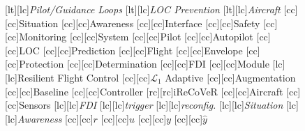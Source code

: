 \documentclass[letter,onecolumn,12pt]{aiaa-tc}
\newcommand{\Lone}{\mathcal{L}_1}
\begin{document}
\begin{figure}[t]
\centering
\small
{}[lt][lc]{{\sf \it Pilot/Guidance Loops}}
[lt][lc]{{\sf \it LOC Prevention}}
[lt][lc]{{\sf \it Aircraft}}
%
[cc][cc]{{\sf Situation}}
[cc][cc]{{\sf Awareness}}
[cc][cc]{{\sf Interface}}
%
[cc][cc]{{\sf Safety}}
[cc][cc]{{\sf Monitoring}}
[cc][cc]{{\sf System}}
%
[cc][cc]{{\sf Pilot}}
[cc][cc]{{\sf Autopilot}}
%
[cc][cc]{{\sf LOC}}
[cc][cc]{{\sf Prediction}}
%
[cc][cc]{{\sf Flight}}
[cc][cc]{{\sf Envelope}}
[cc][cc]{{\sf Protection}}
[cc][cc]{{\sf Determination}}
%
[cc][cc]{{\sf FDI}}
[cc][cc]{{\sf Module}}
%
[lc][lc]{{\sf Resilient Flight Control}}
[cc][cc]{{\sf $\Lone$ Adaptive}}
[cc][cc]{{\sf Augmentation}}
[cc][cc]{{\sf Baseline}}
[cc][cc]{{\sf Controller}}
%
[rc][rc]{{\sf iReCoVeR}}
%
[cc][cc]{{\sf Aircraft}}
[cc][cc]{{\sf Sensors}}
%
[lc][lc]{{\sf \it FDI}}
[lc][lc]{{\sf \it trigger}}
%
[lc][lc]{{\sf \it reconfig.}}
%
[lc][lc]{{\sf \it Situation}}
[lc][lc]{{\sf \it Awareness}}
%
[cc][cc]{$r$}
[cc][cc]{$u$}
[cc][cc]{$y$}
[cc][cc]{$\hat{y}$}
%

\end{figure}
\end{document}
